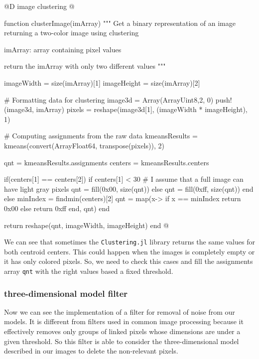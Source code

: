 \documentclass[11pt,oneside]{article}	%
\begin{document}
@D image clustering
@{function clusterImage(imArray)
  """
  Get a binary representation of an image returning
  a two-color image using clustering
  
  imArray: array containing pixel values
  
  return the imArray with only two different values
  """
  
  imageWidth = size(imArray)[1]
  imageHeight = size(imArray)[2]

  # Formatting data for clustering
  image3d = Array(Array{Uint8,2}, 0)
  push!(image3d, imArray)
  pixels = reshape(image3d[1], (imageWidth * imageHeight), 1)
  
  # Computing assignments from the raw data
  kmeansResults = kmeans(convert(Array{Float64}, transpose(pixels)), 2)
  
  qnt = kmeansResults.assignments
  centers = kmeansResults.centers
  
  if(centers[1] == centers[2])
    if centers[1] < 30 # I assume that a full image can have light gray pixels
      qnt = fill(0x00, size(qnt))
    else
      qnt = fill(0xff, size(qnt))
    end
  else
    minIndex = findmin(centers)[2]
    qnt = map(x-> if x == minIndex return 0x00 else return 0xff end, qnt)
  end
  
  return reshape(qnt, imageWidth, imageHeight)  
end @}


We can see that sometimes the \texttt{Clustering.jl} library returns the same values for both centroid centers. This could happen when the images is completely empty or it has only colored pixels. So, we need to check this cases and fill the assignments array \texttt{qnt} with the right values based a fixed threshold.

\subsubsection{three-dimensional model filter}\label{sec:3dfilter}

Now we can see the implementation of a filter for removal of noise from our models.
It is different from filters used in common image processing because it effectively removes only groups of linked pixels whose dimensions are under a given threshold. So this filter is able to consider the three-dimensional model described in our images to delete the non-relevant pixels.
\end{document}
